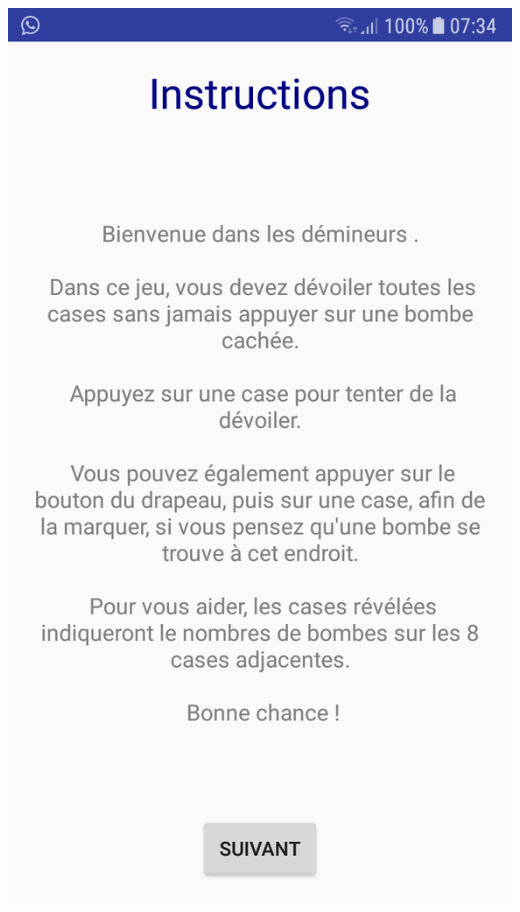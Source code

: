 \documentclass{article}
\begin{document}
\begin{center}
  \includegraphics[scale=0.12]{Intro.png}

\end{center}
\end{document}
